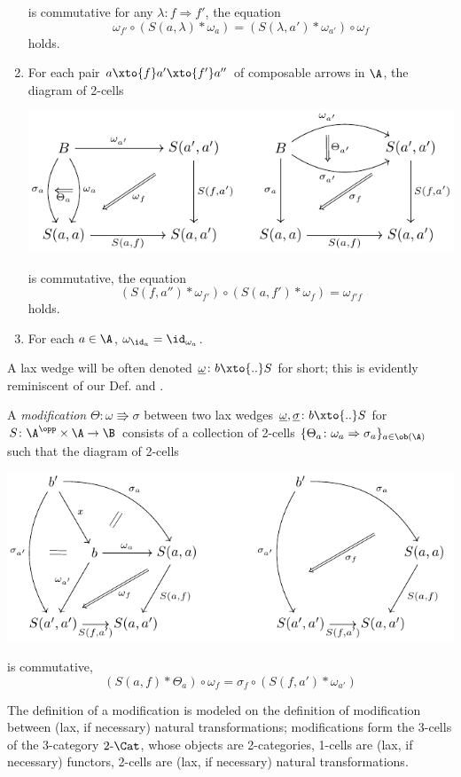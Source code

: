 \begin{definition}
\begin{enumerate}[label=(\oldstylenums{\arabic*})]
\begin{center}
\end{center}
is commutative for any $\lambda\colon f\Rightarrow f'$, \ie   the equation
\[
\omega_{f'}\circ (S(a, \lambda)*\omega_a) = (S(\lambda, a') * \omega_{a'})\circ \omega_f
\]
holds.
\item For each pair $a\xto{f}a'\xto{f'}a''$ of composable arrows in $\A$, the diagram of 2-cells
\begin{center}
\includegraphics[scale=1]{figures/fig17}
\end{center}
is commutative, \ie   the equation
\[
(S(f, a'') * \omega_{f'})\circ (S(a, f') * \omega_f) = \omega_{f'f}
\]
holds.
\item For each $a\in\A$, $\omega_{\id_a} = \id_{\omega_a}$.
\end{enumerate}
\end{definition}
\begin{notat}
A lax wedge will be often denoted $\underline{\omega}\colon b\xto{..}S$ for short; this is evidently reminiscent of our Def\@.  and \cite{McL}.
\end{notat}
\begin{definition}[Modification]\label{modification}
A \emph{modification} $\Theta\colon \omega\Rrightarrow\sigma$ between two lax wedges $\underline{\omega},\underline{\sigma}\colon b\xto{..}S$ for $S\colon \A^\opp\times \A \to \B$ consists of a collection of 2-cells $\{ \Theta_a\colon \omega_a\Rightarrow \sigma_a\}_{a\in \ob(\A)}$ such that the diagram of 2-cells
\begin{center}
\includegraphics[scale=1]{figures/fig18}
\end{center}
is commutative, \ie 
\[
(S(a,f) * \Theta_a)\circ \omega_f = \sigma_f \circ (S(f,a') * \omega_{a'})
\]
\end{definition}
The definition of a modification is modeled on the definition of modification between (lax, if necessary) natural transformations; modifications form the 3-cells of the 3-category $2\text{-}\Cat$, whose objects are 2-categories, 1-cells are (lax, if necessary) functors, 2-cells are (lax, if necessary) natural transformations.

